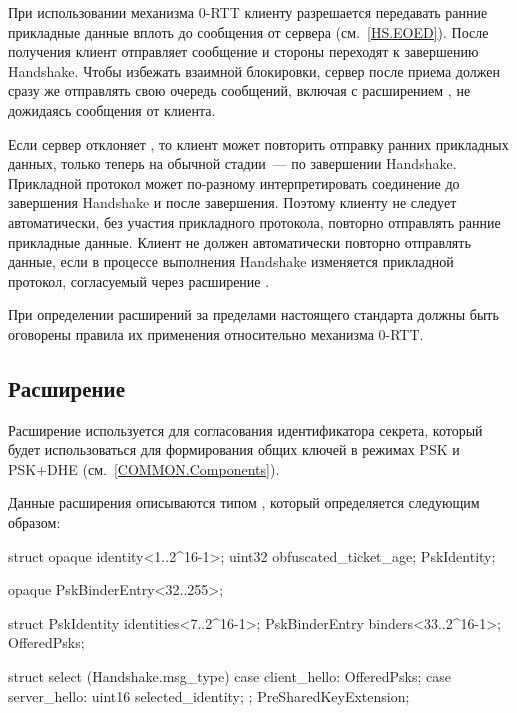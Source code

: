 При использовании механизма 0-RTT клиенту разрешается передавать ранние
прикладные данные вплоть до сообщения  от сервера
(см.~\ref{HS.EOED}). После получения  клиент отправляет
сообщение  и стороны переходят к завершению
Handshake. Чтобы избежать взаимной блокировки, сервер после приема
 должен сразу же отправлять свою очередь сообщений,
включая  с расширением , не
дожидаясь сообщения  от клиента.


Если сервер отклоняет , то клиент может повторить отправку 
ранних прикладных данных, только теперь на обычной стадии~--- по завершении 
Handshake.
%
Прикладной протокол может по-разному интерпретировать соединение
до завершения Handshake и после завершения. Поэтому клиенту не следует 
автоматически, без участия прикладного протокола, повторно отправлять ранние 
прикладные данные.
%
Клиент не должен автоматически повторно отправлять данные, если в процессе 
выполнения Handshake изменяется прикладной протокол, согласуемый
через расширение .

При определении расширений за пределами настоящего стандарта должны быть 
оговорены правила их применения относительно механизма 0-RTT.

\subsection{Расширение }\label{HS.Ext.psk} 

Расширение  используется для согласования 
идентификатора секрета, который будет использоваться для формирования общих 
ключей в режимах PSK и PSK+DHE (см.~\ref{COMMON.Components}).

Данные расширения  описываются типом 
, который определяется следующим образом:

\begin{codeblock}
struct {
  opaque identity<1..2^16-1>;
  uint32 obfuscated_ticket_age;
} PskIdentity;

opaque PskBinderEntry<32..255>;

struct {
  PskIdentity identities<7..2^16-1>;
  PskBinderEntry binders<33..2^16-1>;
} OfferedPsks;

struct {
  select (Handshake.msg_type) {
    case client_hello: OfferedPsks;
    case server_hello: 
      uint16 selected_identity;
  };
} PreSharedKeyExtension;
\end{codeblock}

